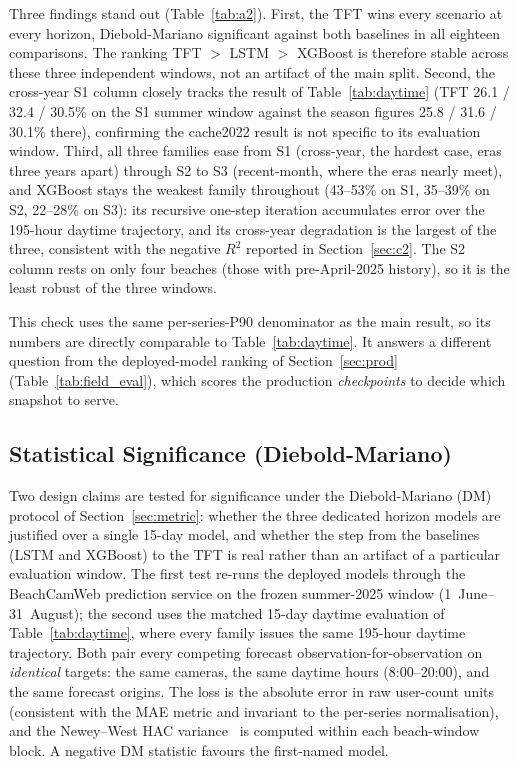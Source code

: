 \documentclass[twocolumn,twoside,a4paper,10pt]{IEEEtran}
\begin{document}
Three findings stand out (Table~\ref{tab:a2}). First, the TFT wins every scenario at every horizon, Diebold-Mariano significant against both baselines in all eighteen comparisons. The ranking TFT $>$ LSTM $>$ XGBoost is therefore stable across these three independent windows, not an artifact of the main split. Second, the cross-year S1 column closely tracks the result of Table~\ref{tab:daytime} (TFT 26.1 / 32.4 / 30.5\% on the S1 summer window against the season figures 25.8 / 31.6 / 30.1\% there), confirming the cache2022 result is not specific to its evaluation window. Third, all three families ease from S1 (cross-year, the hardest case, eras three years apart) through S2 to S3 (recent-month, where the eras nearly meet), and XGBoost stays the weakest family throughout (43--53\% on S1, 35--39\% on S2, 22--28\% on S3): its recursive one-step iteration accumulates error over the 195-hour daytime trajectory, and its cross-year degradation is the largest of the three, consistent with the negative $R^2$ reported in Section~\ref{sec:c2}. The S2 column rests on only four beaches (those with pre-April-2025 history), so it is the least robust of the three windows.

This check uses the same per-series-P90 denominator as the main result, so its numbers are directly comparable to Table~\ref{tab:daytime}. It answers a different question from the deployed-model ranking of Section~\ref{sec:prod} (Table~\ref{tab:field_eval}), which scores the production \emph{checkpoints} to decide which snapshot to serve.

\subsection{Statistical Significance (Diebold-Mariano)}\label{sec:dm}

Two design claims are tested for significance under the Diebold-Mariano (DM) protocol of Section~\ref{sec:metric}: whether the three dedicated horizon models are justified over a single 15-day model, and whether the step from the baselines (LSTM and XGBoost) to the TFT is real rather than an artifact of a particular evaluation window. The first test re-runs the deployed models through the BeachCamWeb prediction service on the frozen summer-2025 window (1~June--31~August); the second uses the matched 15-day daytime evaluation of Table~\ref{tab:daytime}, where every family issues the same 195-hour daytime trajectory. Both pair every competing forecast observation-for-observation on \emph{identical} targets: the same cameras, the same daytime hours (8:00--20:00), and the same forecast origins. The loss is the absolute error in raw user-count units (consistent with the MAE metric and invariant to the per-series normalisation), and the Newey--West HAC variance~\cite{NeweyWest1987} is computed within each beach-window block. A negative DM statistic favours the first-named model.
\end{document}
